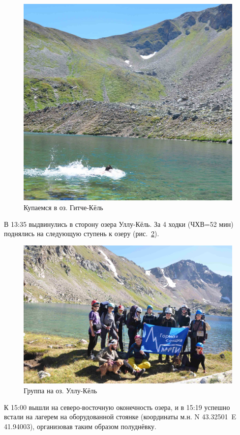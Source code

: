 \begin{figure}[h!]
	\centering
	\begin{turn}{0}
		\includegraphics[width=0.7\linewidth]{../pics/DSC_0774}
	\end{turn}
	\caption{Купаемся в оз. Гитче-Кёль}
	\label{fig:DSC_0774}
\end{figure}


В 13:35 выдвинулись в сторону озера Уллу-Кёль. За 4 ходки (ЧХВ=52 мин) поднялись на следующую ступень к озеру (рис.~\ref{fig:DSC_0800}). 

\begin{figure}[h!]
	\centering
	\includegraphics[width=0.7\linewidth]{../pics/DSC_0800}
	\caption{Группа на оз. Уллу-Кёль}
	\label{fig:DSC_0800}
\end{figure}

К 15:00 вышли на северо-восточную оконечность озера, и в 15:19 успешно встали на лагерем на оборудованной стоянке (координаты м.н. N 43.32501\degree~E 41.94003\degree), организовав таким образом полуднёвку.

